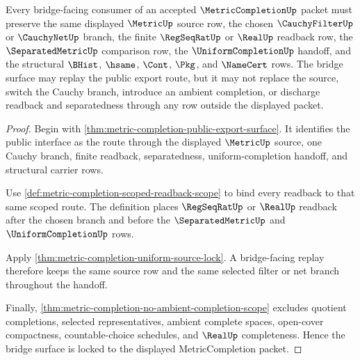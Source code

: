 \begin{theorem}
\label{thm:metriccompletion-bridge-surface-lock}
Every bridge-facing consumer of an accepted $\MetricCompletionUp$ packet must preserve the same displayed $\MetricUp$ source row, the chosen $\CauchyFilterUp$ or $\CauchyNetUp$ branch, the finite $\RegSeqRatUp$ or $\RealUp$ readback row, the $\SeparatedMetricUp$ comparison row, the $\UniformCompletionUp$ handoff, and the structural $\BHist$, $\hsame$, $\Cont$, $\Pkg$, and $\NameCert$ rows. The bridge surface may replay the public export route, but it may not replace the source, switch the Cauchy branch, introduce an ambient completion, or discharge readback and separatedness through any row outside the displayed packet.
\end{theorem}
\begin{proof}
Begin with \autoref{thm:metric-completion-public-export-surface}. It identifies the public interface as the route through the displayed $\MetricUp$ source, one Cauchy branch, finite readback, separatedness, uniform-completion handoff, and structural carrier rows.

Use \autoref{def:metric-completion-scoped-readback-scope} to bind every readback to that same scoped route. The definition places $\RegSeqRatUp$ or $\RealUp$ readback after the chosen branch and before the $\SeparatedMetricUp$ and $\UniformCompletionUp$ rows.

Apply \autoref{thm:metric-completion-uniform-source-lock}. A bridge-facing replay therefore keeps the same source row and the same selected filter or net branch throughout the handoff.

Finally, \autoref{thm:metric-completion-no-ambient-completion-scope} excludes quotient completions, selected representatives, ambient complete spaces, open-cover compactness, countable-choice schedules, and $\RealUp$ completeness. Hence the bridge surface is locked to the displayed MetricCompletion packet.
\end{proof}


